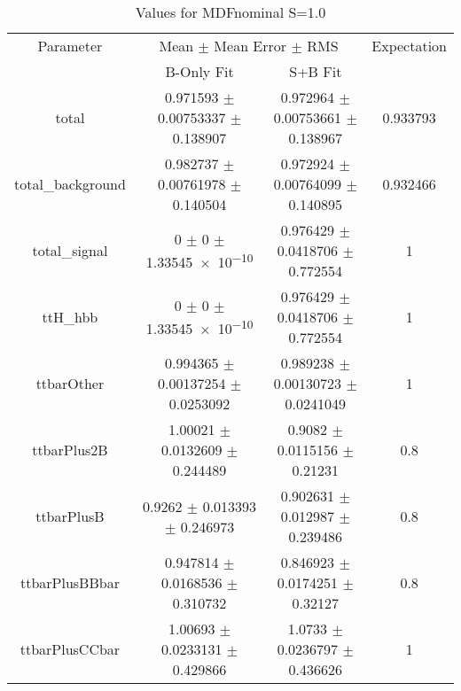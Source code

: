 \begin{table}
\centering
\caption{Values for MDFnominal S=1.0}
\begin{tabular}{cccc}
\toprule
Parameter & \multicolumn{2}{c}{Mean $\pm$ Mean Error $\pm$ RMS} & Expectation\\
 & B-Only Fit & S+B Fit & \\
\midrule
total & \num{0.971593} $\pm$ \num{0.00753337} $\pm$ \num{0.138907} & \num{0.972964} $\pm$ \num{0.00753661} $\pm$ \num{0.138967} & \num{0.933793}\\
total\_background & \num{0.982737} $\pm$ \num{0.00761978} $\pm$ \num{0.140504} & \num{0.972924} $\pm$ \num{0.00764099} $\pm$ \num{0.140895} & \num{0.932466}\\
total\_signal & \num{0} $\pm$ \num{0} $\pm$ \num{1.33545e-10} & \num{0.976429} $\pm$ \num{0.0418706} $\pm$ \num{0.772554} & \num{1}\\
ttH\_hbb & \num{0} $\pm$ \num{0} $\pm$ \num{1.33545e-10} & \num{0.976429} $\pm$ \num{0.0418706} $\pm$ \num{0.772554} & \num{1}\\
ttbarOther & \num{0.994365} $\pm$ \num{0.00137254} $\pm$ \num{0.0253092} & \num{0.989238} $\pm$ \num{0.00130723} $\pm$ \num{0.0241049} & \num{1}\\
ttbarPlus2B & \num{1.00021} $\pm$ \num{0.0132609} $\pm$ \num{0.244489} & \num{0.9082} $\pm$ \num{0.0115156} $\pm$ \num{0.21231} & \num{0.8}\\
ttbarPlusB & \num{0.9262} $\pm$ \num{0.013393} $\pm$ \num{0.246973} & \num{0.902631} $\pm$ \num{0.012987} $\pm$ \num{0.239486} & \num{0.8}\\
ttbarPlusBBbar & \num{0.947814} $\pm$ \num{0.0168536} $\pm$ \num{0.310732} & \num{0.846923} $\pm$ \num{0.0174251} $\pm$ \num{0.32127} & \num{0.8}\\
ttbarPlusCCbar & \num{1.00693} $\pm$ \num{0.0233131} $\pm$ \num{0.429866} & \num{1.0733} $\pm$ \num{0.0236797} $\pm$ \num{0.436626} & \num{1}\\
\bottomrule
\end{tabular}
\end{table}